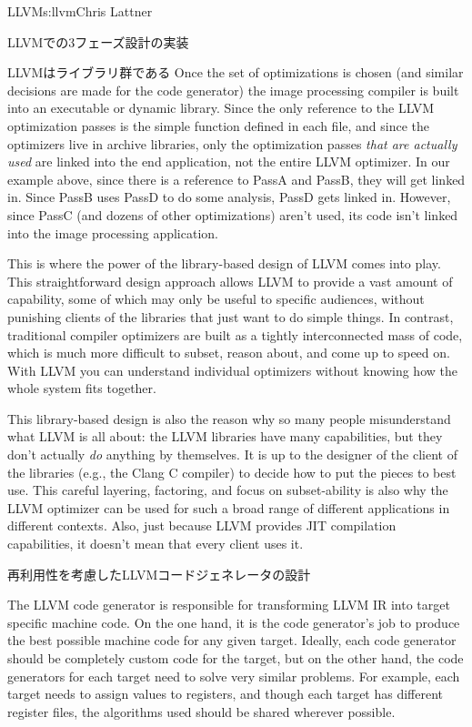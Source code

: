 \begin{aosachapter}{LLVM}{s:llvm}{Chris Lattner}
\begin{aosasect1}{LLVMでの3フェーズ設計の実装}
\begin{aosasect2}{LLVMはライブラリ群である}
Once the set of optimizations is chosen (and similar decisions are
made for the code generator) the image processing compiler is built
into an executable or dynamic library.  Since the only reference to
the LLVM optimization passes is the simple  function
defined in each  file, and since the optimizers live in
 archive libraries, only the optimization passes \emph{that
are actually used} are linked into the end application, not the
entire LLVM optimizer.  In our example above, since there is a
reference to PassA and PassB, they will get linked in.  Since PassB
uses PassD to do some analysis, PassD gets linked in.  However, since
PassC (and dozens of other optimizations) aren't used, its code isn't
linked into the image processing application.

This is where the power of the library-based design of LLVM comes into
play. This straightforward design approach allows LLVM to provide a
vast amount of capability, some of which may only be useful to
specific audiences, without punishing clients of the libraries that
just want to do simple things. In contrast, traditional compiler
optimizers are built as a tightly interconnected mass of code, which
is much more difficult to subset, reason about, and come up to speed
on. With LLVM you can understand individual optimizers without knowing
how the whole system fits together.

This library-based design is also the reason why so many people
misunderstand what LLVM is all about: the LLVM libraries have many
capabilities, but they don't actually \emph{do} anything by themselves.
It is up to the designer of the client of the libraries (e.g., the
Clang C compiler) to decide how to put the pieces to best use.  This
careful layering, factoring, and focus on subset-ability is also why
the LLVM optimizer can be used for such a broad range of different
applications in different contexts.  Also, just because LLVM provides
JIT compilation capabilities, it doesn't mean that every client uses
it.

\end{aosasect2}

\end{aosasect1}

\begin{aosasect1}{再利用性を考慮したLLVMコードジェネレータの設計}

The LLVM code generator is responsible for transforming LLVM IR into
target specific machine code.  On the one hand, it is the code
generator's job to produce the best possible machine code for any
given target.  Ideally, each code generator should be completely
custom code for the target, but on the other hand, the code generators
for each target need to solve very similar problems.  For example,
each target needs to assign values to registers, and though each
target has different register files, the algorithms used should be
shared wherever possible.


\end{aosasect1}
\end{aosachapter}
